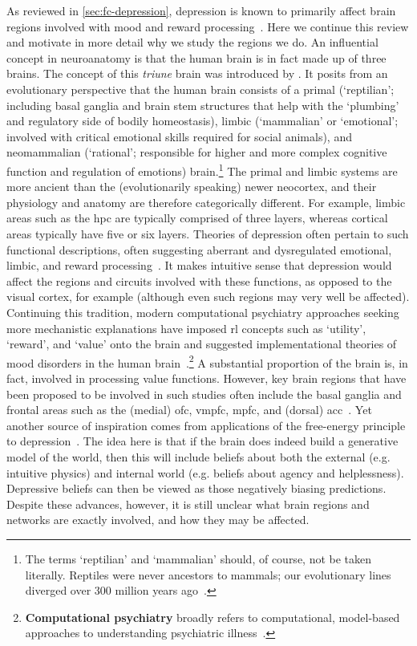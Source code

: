 As reviewed in \cref{sec:fc-depression}, depression is known to primarily affect brain regions involved with mood and reward processing~\parencite{Pandya2012}.
Here we continue this review and motivate in more detail why we study the regions we do.
%
An influential concept in neuroanatomy is that the human brain is in fact made up of three brains.
The concept of this \emph{triune} brain was introduced by \textcite{Maclean1985}.
It posits from an evolutionary perspective that the human brain consists of a primal (`reptilian'; including basal ganglia and brain stem structures that help with the `plumbing' and regulatory side of bodily homeostasis), limbic (`mammalian' or `emotional'; involved with critical emotional skills required for social animals), and neomammalian (`rational'; responsible for higher and more complex cognitive function and regulation of emotions) brain.\footnote{The terms `reptilian' and `mammalian' should, of course, not be taken literally. Reptiles were never ancestors to mammals; our evolutionary lines diverged over 300 million years ago~\parencite{Striedter2019}.}
The primal and limbic systems are more ancient than the (evolutionarily speaking) newer neocortex, and their physiology and anatomy are therefore categorically different.
For example, limbic areas such as the \gls{hpc} are typically comprised of three layers, whereas cortical areas typically have five or six layers.
Theories of depression often pertain to such functional descriptions, often suggesting aberrant and dysregulated emotional, limbic, and reward processing~\parencite{Akiskal1973}.
It makes intuitive sense that depression would affect the regions and circuits involved with these functions, as opposed to the visual cortex, for example (although even such regions may very well be affected).
Continuing this tradition, modern computational psychiatry approaches seeking more mechanistic explanations have imposed \gls{rl} concepts such as `utility', `reward', and `value' onto the brain and suggested implementational theories of mood disorders in the human brain~\parencite{Huys2013, Chen2015, Eldar2016, Juechems2019, Bennett2020, Bennett2021}.\footnote{\textbf{Computational psychiatry} broadly refers to computational, model-based approaches to understanding psychiatric illness~\parencite{Montague2012, Adams2016, Radulescu2019, Huys2021}.}
A substantial proportion of the brain is, in fact, involved in processing value functions.
However, key brain regions that have been proposed to be involved in such studies often include the basal ganglia and frontal areas such as the (medial) \gls{ofc}, \gls{vmpfc}, \gls{mpfc}, and (dorsal) \gls{acc}~\parencite{Lee2012}.
%
Yet another source of inspiration comes from applications of the free-energy principle to depression~\parencite{Chekroud2015}.
The idea here is that if the brain does indeed build a generative model of the world, then this will include beliefs about both the external (e.g. intuitive physics) and internal world (e.g. beliefs about agency and helplessness).
Depressive beliefs can then be viewed as those negatively biasing predictions.
Despite these advances, however, it is still unclear what brain regions and networks are exactly involved, and how they may be affected.


